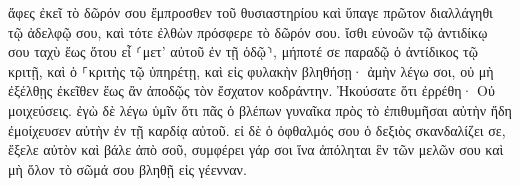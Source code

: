 \documentclass{openreader}
\begin{document}
ἄφες ἐκεῖ τὸ δῶρόν σου ἔμπροσθεν τοῦ θυσιαστηρίου καὶ ὕπαγε πρῶτον διαλλάγηθι τῷ ἀδελφῷ σου, καὶ τότε ἐλθὼν πρόσφερε τὸ δῶρόν σου. 
ἴσθι εὐνοῶν τῷ ἀντιδίκῳ σου ταχὺ ἕως ὅτου εἶ ⸂μετ’ αὐτοῦ ἐν τῇ ὁδῷ⸃, μήποτέ σε παραδῷ ὁ ἀντίδικος τῷ κριτῇ, καὶ ὁ ⸀κριτὴς τῷ ὑπηρέτῃ, καὶ εἰς φυλακὴν βληθήσῃ· 
ἀμὴν λέγω σοι, οὐ μὴ ἐξέλθῃς ἐκεῖθεν ἕως ἂν ἀποδῷς τὸν ἔσχατον κοδράντην. 
Ἠκούσατε ὅτι ἐρρέθη· Οὐ μοιχεύσεις. 
ἐγὼ δὲ λέγω ὑμῖν ὅτι πᾶς ὁ βλέπων γυναῖκα πρὸς τὸ ἐπιθυμῆσαι αὐτὴν ἤδη ἐμοίχευσεν αὐτὴν ἐν τῇ καρδίᾳ αὐτοῦ. 
εἰ δὲ ὁ ὀφθαλμός σου ὁ δεξιὸς σκανδαλίζει σε, ἔξελε αὐτὸν καὶ βάλε ἀπὸ σοῦ, συμφέρει γάρ σοι ἵνα ἀπόληται ἓν τῶν μελῶν σου καὶ μὴ ὅλον τὸ σῶμά σου βληθῇ εἰς γέενναν. 
\end{document}
